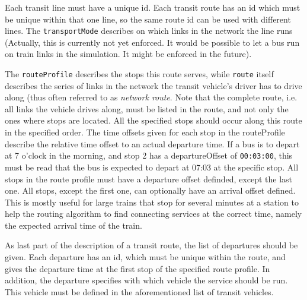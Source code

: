 Each transit line must have a unique id. Each transit route has an id which must
be unique within that one line, so the same route id can be used with different
lines. The {\tt transportMode} describes on which links in the network the line
runs (Actually, this is currently not yet enforced. It would be possible to let
a bus run on train links in the simulation. It might be enforced in the future).

The {\tt routeProfile} describes the stops this route serves, while {\tt route}
itself describes the series of links in the network the transit vehicle's driver
has to drive along (thus often referred to as \emph{network route}. Note that
the complete route, i.e. all links the vehicle drives along, must be listed in
the route, and not only the ones where stops are located. All the specified
stops should occur along this route in the specified order. The time offsets
given for each stop in the routeProfile describe the relative time offset to an
actual departure time. If a bus is to depart at 7 o'clock in the morning, and
stop 2 has a departureOffset of {\tt 00:03:00}, this must be read that the bus
is expected to depart at 07:03 at the specific stop. All stops in the route
profile must have a departure offset definded, except the last one. All stops,
except the first one, can optionally have an arrival offset defined. This is
mostly useful for large trains that stop for several minutes at a station to
help the routing algorithm to find connecting services at the correct time,
namely the expected arrival time of the train.

As last part of the description of a transit
route, the list of departures should be given. Each departure has an id, which must be unique within the
route, and gives the departure time at the first stop of the specified
route profile. In addition, the departure specifies with which vehicle the
service should be run. This vehicle must be defined in the aforementioned
list of transit vehicles.

